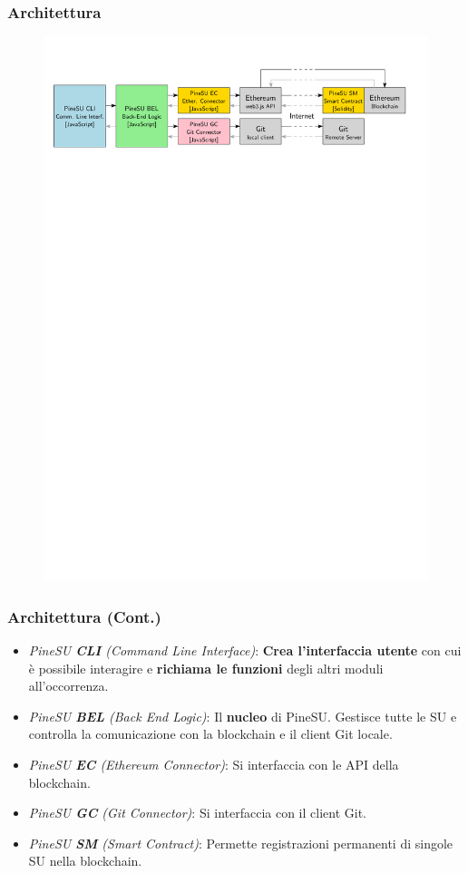 \documentclass{beamer}
\begin{document}
\begin{frame}
	\frametitle{Architettura}
	\centering
	\begin{figure}
		\includegraphics[width=\textwidth]{figures/pineSU-architecture.pdf}
	\end{figure}
\end{frame}

\begin{frame}
	\frametitle{Architettura (Cont.)}
	\begin{itemize}
		\item \emph{PineSU \textbf{CLI} (Command Line Interface)}: \textbf{Crea l'interfaccia utente} con cui è possibile
			interagire e \textbf{richiama le funzioni} degli altri moduli all'occorrenza.
		\item \emph{PineSU \textbf{BEL} (Back End Logic)}: Il \textbf{nucleo} di PineSU.
		Gestisce tutte le SU e controlla la comunicazione con la blockchain e il client Git locale.
		\item \emph{PineSU \textbf{EC} (Ethereum Connector)}: Si interfaccia con le API della blockchain. 
		\item \emph{PineSU \textbf{GC} (Git Connector)}: Si interfaccia con il client Git. 
		\item \emph{PineSU \textbf{SM} (Smart Contract)}: Permette registrazioni permanenti di singole SU nella blockchain.
	\end{itemize}
\end{frame}
\end{document}

